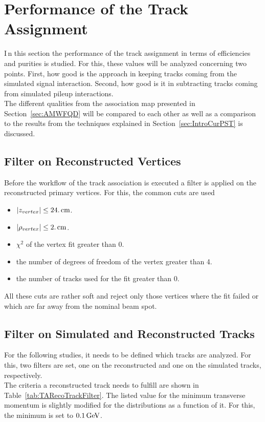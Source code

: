 \chapter{Performance of the Track Assignment \label{sec:TrackAss} }

\lettrine[lines=2]{I}{\,}n this section the performance of the track assignment in terms of efficiencies and purities is studied. For this, these values will be analyzed concerning two points. First, how good is the approach in keeping tracks coming from the simulated signal interaction. Second, how good is it in subtracting tracks coming from simulated pileup interactions.\\
The different qualities from the association map presented in Section~\ref{sec:AMWFQD} will be compared to each other as well as a comparison to the results from the techniques explained in Section~\ref{sec:IntroCurPST} is discussed.

\section{Filter on Reconstructed Vertices \label{sec:TAFVC}}

Before the workflow of the track association is executed a filter is applied on the reconstructed primary vertices. For this, the common cuts are used
\begin{itemize}
\item $ \left| z_{vertex} \right| \leq 24.\,\text{cm}$.
\item $ \left| \rho_{vertex} \right| \leq 2.\,\text{cm}$.
\item $\chi^{2}$ of the vertex fit greater than 0.
\item the number of degrees of freedom of the vertex greater than 4.
\item the number of tracks used for the fit greater than 0.
\end{itemize}
All these cuts are rather soft and reject only those vertices where the fit failed or which are far away from the nominal beam spot. 

\section{Filter on Simulated and Reconstructed Tracks \label{sec:TAFSRT}}

For the following studies, it needs to be defined which tracks are analyzed. For this, two filters are set, one on the reconstructed and one on the simulated tracks, respectively. \\
The criteria a reconstructed track needs to fulfill are shown in Table~\ref{tab:TARecoTrackFilter}. The listed value for the minimum transverse momentum is slightly modified for the distributions as a function of it. For this, the minimum \pt is set to $0.1\,\text{Ge\hspace{-.08em}V}$.

